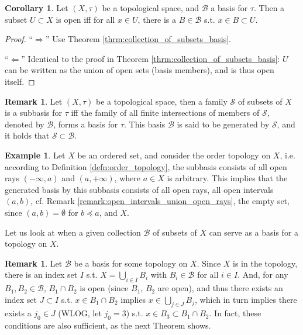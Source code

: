 \documentclass[12pt, a4paper]{article}
\numberwithin{equation}{section}
\theoremstyle{definition}
\theoremstyle{definition}
\newtheorem{exmp}[thm]{Example} %
\newtheorem{remark}[thm]{Remark} %
\newtheorem{corollary}[thm]{Corollary}
\begin{document}
		\begin{corollary}
			Let $(X, \tau)$ be a topological space, and $\mathscr B$ a basis for $\tau$. Then a subset $U\subset X$ is open iff for all $x\in U$, there is a $B\in\mathscr B$ s.t. $x\in B\subset U$.
		\end{corollary}
	
		\begin{proof}
			\enquote{$\Longrightarrow$} Use Theorem \ref{thrm:collection_of_subsets_basis}.
			
			\enquote{$\Longleftarrow$} Identical to the proof in Theorem \ref{thrm:collection_of_subsets_basis}: $U$ can be written as the union of open sets (basis members), and is thus open itself.
		\end{proof}
		
		\begin{remark}
			Let $(X, \tau)$ be a topological space, then a family $\mathscr S$ of subsets of $X$ is a subbasis for $\tau$ iff the family of all finite intersections of members of $\mathscr S$, denoted by $\mathscr B$, forms a basis for $\tau$. This basis $\mathscr B$ is said to be generated by $\mathscr S$, and it holds that $\mathscr S \subset \mathscr B$.
		\end{remark}
	
		\begin{exmp}
			Let $X$ be an ordered set, and consider the order topology on $X$, i.e. according to Definition \ref{defn:order_topology}, the subbasis consists of all open rays $(-\infty, a)$ and $(a, +\infty)$, where $a\in X$ is arbitrary. This implies that the generated basis by this subbasis consists of all open rays, all open intervals $(a, b)$, cf. Remark \ref{remark:open_intervals_union_open_rays}, the empty set, since $(a, b) = \emptyset$ for $b\preceq a$, and $X$.
		\end{exmp}
		
		Let us look at when a given collection $\mathscr B$ of subsets of $X$ can serve as a basis for a topology on $X$.
		
		\begin{remark}
			Let $\mathscr B$ be a basis for some topology on $X$. Since $X$ is in the topology, there is an index set $I$ s.t. $X = \bigcup_{i\in I}B_i$ with $B_i\in\mathscr B$ for all $i\in I$. And, for any $B_1, B_2\in\mathscr B$, $B_1\cap B_2$ is open (since $B_1$, $B_2$ are open), and thus there exists an index set $J\subset I$ s.t. $x\in B_1\cap B_2$ implies $x\in \bigcup_{j\in J}B_j$, which in turn implies there exists a $j_0 \in J$ (WLOG, let $j_0 = 3$) s.t. $x\in B_3\subset B_1\cap B_2$. In fact, these conditions are also sufficient, as the next Theorem shows.
		\end{remark}
	
\end{document}
